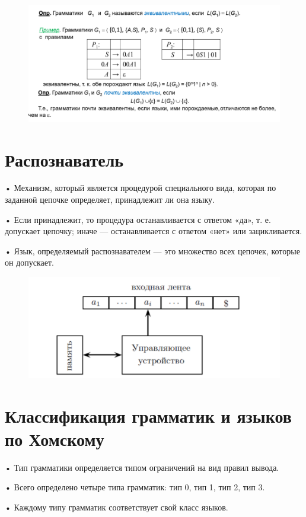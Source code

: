 \documentclass{article}
\begin{document}
\begin{figure}[H]
    \centering
    \includegraphics[width=1\linewidth]{Снимок экрана 2025-02-20 091507.png}
\end{figure}


\section{Распознаватель}
• Механизм, который является процедурой специального вида, которая по
заданной цепочке определяет, принадлежит ли она языку.

• Если принадлежит, то процедура останавливается с ответом «да», т. е.
допускает цепочку; иначе — останавливается с ответом «нет» или
зацикливается.

• Язык, определяемый распознавателем — это множество всех цепочек,
которые он допускает.

\begin{figure}[H]
    \centering
    \includegraphics[width=0.5\linewidth]{Снимок экрана 2025-02-20 091653.png}
\end{figure}

\section{Классификация грамматик и языков по Хомскому}


• Тип грамматики определяется типом ограничений на вид
правил вывода.

• Всего определено четыре типа грамматик:
тип 0, тип 1, тип 2, тип 3.

• Каждому типу грамматик соответствует свой класс
языков.
\end{document}
